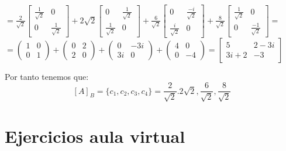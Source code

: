 \documentclass{report}
\begin{document}
\begin{enumerate}
\begin{enumerate}[label=\alph*)]
    $=\frac{2}{\sqrt{2}}\left[\begin{array}{cc}
    \frac{1}{\sqrt{2}} & 0 \\
    0 & \frac{1}{\sqrt{2}}
    \end{array}\right]+2 \sqrt{2}\left[\begin{array}{cc}
    0 & \frac{1}{\sqrt{2}} \\
    \frac{1}{\sqrt{2}} & 0
    \end{array}\right]+\frac{6}{\sqrt{2}}\left[\begin{array}{cc}
    0 & \frac{-i}{\sqrt{2}} \\
    \frac{i}{\sqrt{2}} & 0
    \end{array}\right]+\frac{8}{\sqrt{2}}\left[\begin{array}{cc}
    \frac{1}{\sqrt{2}} & 0 \\
    0 & \frac{-1}{\sqrt{2}}
    \end{array}\right]=$\\
    $=\begin{pmatrix}
        1 &0\\
        0 & 1
    \end{pmatrix}+\begin{pmatrix}
        0 &2 \\
        2 & 0
    \end{pmatrix}+\begin{pmatrix}
        0 & -3i\\
        3i & 0
    \end{pmatrix}+\begin{pmatrix}
        4 & 0\\
        0 & -4
    \end{pmatrix}=\left[\begin{matrix}5 & 2 - 3 i\\3 i + 2 & -3\end{matrix}\right]$
    
    
    Por tanto tenemos que: $$[A]_B=\{c_1,c_2,c_3,c_4\}=\frac{2}{\sqrt{2}}.2\sqrt{2},\frac{6}{\sqrt{2}},\frac{8}{\sqrt{2}}$$
    \end{enumerate}
    \end{enumerate}
    
    \newpage 
    \section*{Ejercicios aula virtual}
    
\end{document}
